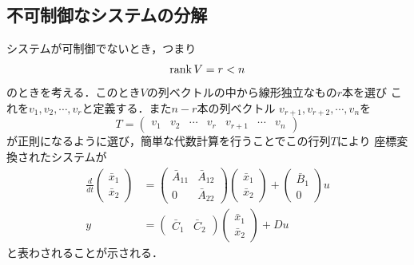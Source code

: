 \subsection{不可制御なシステムの分解 \label{sec:controllability_decomp}}

システムが可制御でないとき，つまり
\begin{equation}
 \mathop{\rm rank}\nolimits V = r < n
\end{equation}
のときを考える．このとき$V$の列ベクトルの中から線形独立なもの$r$本を選び
これを$v_1, v_2, \cdots, v_r$と定義する．また$n-r$本の列ベクトル
$v_{r+1}, v_{r+2}, \cdots, v_n$を
\begin{equation}
 T = \left(\begin{array}{ccccccc}
            v_1 & v_2 & \cdots & v_r & v_{r+1} & \cdots & v_n
	   \end{array}\right)
\end{equation}
が正則になるように選び，簡単な代数計算を行うことでこの行列$T$により
座標変換されたシステムが
\begin{align}
 \frac{d}{dt}
  \left(\begin{array}{c}
         \bar{x}_1 \\
	 \bar{x}_2 
	\end{array}\right)
  &=
  \left(\begin{array}{cc}
         \bar{A}_{11} & \bar{A}_{12} \\
	 0            & \bar{A}_{22}
	\end{array}\right)
  \left(\begin{array}{c}
         \bar{x}_1 \\
	 \bar{x}_2 
	\end{array}\right)
  +
  \left(\begin{array}{c}
         \bar{B}_1 \\
	 0
	\end{array}\right)
  u \\
 y &=
  \left(\begin{array}{cc}
         \bar{C}_1 & \bar{C}_2 
	\end{array}\right)
  \left(\begin{array}{c}
         \bar{x}_1 \\
	 \bar{x}_2 
	\end{array}\right)
  + D u
\end{align}
と表わされることが示される．


